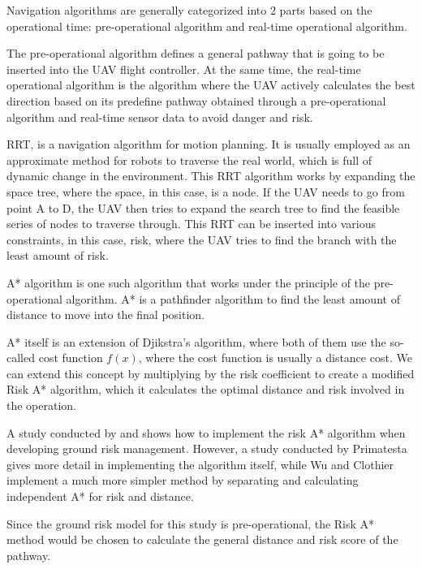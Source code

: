 \documentclass[12pt]{report}
\begin{document}
        Navigation algorithms are generally categorized into 2 parts based on the operational time: pre-operational
        algorithm and real-time operational algorithm. 
        
        The pre-operational algorithm defines a general pathway that is going to be inserted into the UAV flight
        controller. At the same time, the real-time operational algorithm is the algorithm where the UAV actively
        calculates the best direction based on its predefine pathway obtained through a pre-operational algorithm and
        real-time sensor data to avoid danger and risk. 
        
        \ac{RRT}, is a navigation algorithm for motion planning. It is usually employed as
        an approximate method for robots to traverse the real world, which is full of dynamic change in the environment.
        This RRT algorithm works by expanding the space tree, where the space, in this case, is a node. If the UAV needs
        to go from point A to D, the UAV then tries to expand the search tree to find the feasible series of nodes to
        traverse through. This RRT can be inserted into various constraints, in this case, risk, where the UAV tries to
        find the branch with the least amount of risk. 
        
        \ac{A*} algorithm is one such algorithm that works under the principle of the pre-operational algorithm. A* is a
        pathfinder algorithm to find the least amount of distance to move into the final position. 
        
        A* itself is an extension of Djikstra's algorithm, where both of them use the so-called cost function \(f(x)\),
        where the cost function is usually a distance cost. We can extend this concept by multiplying by the risk
        coefficient to create a modified Risk A* algorithm, which it calculates the optimal distance and risk involved
        in the operation. 
        
        A study conducted by \cite{primatesta_ground_2020} and \cite{clothier_casualty_2007} shows how to implement the risk A* algorithm when developing ground risk
        management. However, a study conducted by Primatesta gives more detail in implementing the algorithm itself,
        while Wu and Clothier implement a much more simpler method by separating and calculating independent A* for risk
        and distance. 
        
        Since the ground risk model for this study is pre-operational, the Risk A* method would be chosen to calculate
        the general distance and risk score of the pathway.
\end{document}
